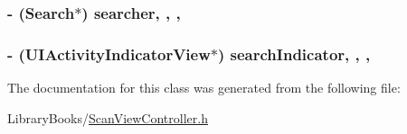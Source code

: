 \subsubsection[{searcher}]{\setlength{\rightskip}{0pt plus 5cm}-\/ ({\bf Search}$\ast$) searcher\hspace{0.3cm}{\ttfamily [read]}, {\ttfamily [write]}, {\ttfamily [atomic]}, {\ttfamily [strong]}}\label{interface_scan_view_controller_afb27be43e63ee6a97de8e10b264ca9ad}
\hypertarget{interface_scan_view_controller_ada67b8724fa93138bd3839cfa6c8218a}{}
\subsubsection[{search\+Indicator}]{\setlength{\rightskip}{0pt plus 5cm}-\/ (U\+I\+Activity\+Indicator\+View$\ast$) search\+Indicator\hspace{0.3cm}{\ttfamily [read]}, {\ttfamily [write]}, {\ttfamily [atomic]}, {\ttfamily [strong]}}\label{interface_scan_view_controller_ada67b8724fa93138bd3839cfa6c8218a}


The documentation for this class was generated from the following file\+:\begin{DoxyCompactItemize}
\item 
Library\+Books/\hyperlink{_scan_view_controller_8h}{Scan\+View\+Controller.\+h}\end{DoxyCompactItemize}
